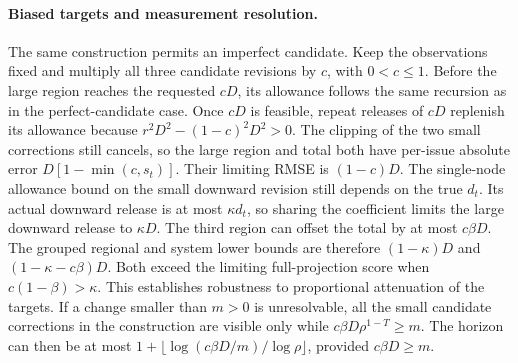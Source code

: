 \paragraph{Biased targets and measurement resolution.}
The same construction permits an imperfect candidate. Keep the observations fixed and multiply all three candidate revisions by $c$, with $0<c\le1$. Before the large region reaches the requested $cD$, its allowance follows the same recursion as in the perfect-candidate case. Once $cD$ is feasible, repeat releases of $cD$ replenish its allowance because $r^2D^2-(1-c)^2D^2>0$. The clipping of the two small corrections still cancels, so the large region and total both have per-issue absolute error $D[1-\min(c,s_t)]$. Their limiting RMSE is $(1-c)D$. The single-node allowance bound on the small downward revision still depends on the true $d_t$. Its actual downward release is at most $\kappa d_t$, so sharing the coefficient limits the large downward release to $\kappa D$. The third region can offset the total by at most $c\beta D$. The grouped regional and system lower bounds are therefore $(1-\kappa)D$ and $(1-\kappa-c\beta)D$. Both exceed the limiting full-projection score when $c(1-\beta)>\kappa$. This establishes robustness to proportional attenuation of the targets. If a change smaller than $m>0$ is unresolvable, all the small candidate corrections in the construction are visible only while $c\beta D\rho^{1-T}\ge m$. The horizon can then be at most $1+\lfloor\log(c\beta D/m)/\log\rho\rfloor$, provided $c\beta D\ge m$.

